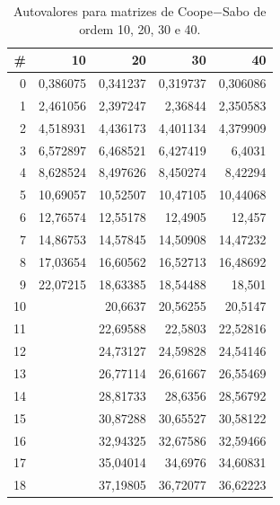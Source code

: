 \begin{table}[pt]
	\caption{Autovalores para matrizes de Coope$-$Sabo de ordem 10, 20, 30 e 40.}
	\label{tab:autovalores10a40}
\begin{center}
\begin{tabular}{r|r|r|r|r}
	\hline \hline
		 \textbf{\#} &   \textbf{10} &   \textbf{20} &   \textbf{30} &   \textbf{40} \\
	\hline \hline
					 0 &   0,386075 &   0,341237 &   0,319737 &   0,306086 \\
	\hline
					 1 &   2,461056 &   2,397247 &    2,36844 &   2,350583 \\
	\hline
					 2 &   4,518931 &   4,436173 &   4,401134 &   4,379909 \\
	\hline
					 3 &   6,572897 &   6,468521 &   6,427419 &     6,4031 \\
	\hline
					 4 &   8,628524 &   8,497626 &   8,450274 &    8,42294 \\
	\hline
					 5 &   10,69057 &   10,52507 &   10,47105 &   10,44068 \\
	\hline
					 6 &   12,76574 &   12,55178 &    12,4905 &     12,457 \\
	\hline
					 7 &   14,86753 &   14,57845 &   14,50908 &   14,47232 \\
	\hline
					 8 &   17,03654 &   16,60562 &   16,52713 &   16,48692 \\
	\hline
					9 &   22,07215 &   18,63385 &   18,54488 &     18,501 \\
	\hline
					10 &            &    20,6637 &   20,56255 &    20,5147 \\
	\hline
					11 &            &   22,69588 &    22,5803 &   22,52816 \\
	\hline
					12 &            &   24,73127 &   24,59828 &   24,54146 \\
	\hline
					13 &            &   26,77114 &   26,61667 &   26,55469 \\
	\hline
					14 &            &   28,81733 &    28,6356 &   28,56792 \\
	\hline
					15 &            &   30,87288 &   30,65527 &   30,58122 \\
	\hline
					16 &            &   32,94325 &   32,67586 &   32,59466 \\
	\hline
					17 &            &   35,04014 &    34,6976 &   34,60831 \\
	\hline
					18 &            &   37,19805 &   36,72077 &   36,62223 \\
	\hline

\end{tabular}
\end{center}
\end{table}
